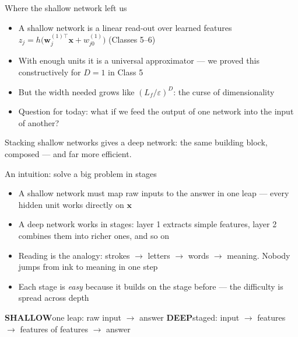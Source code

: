 \documentclass[aspectratio=169, 11pt]{beamer}
\newcommand{\shpar}[2]{%
  \vfill
  {\scriptsize
  \begin{tcolorbox}[enhanced, sidebyside, sidebyside align=top,
                    lefthand ratio=0.485,
                    segmentation style={shc!35, line width=0.6pt},
                    colback=shc!5, colframe=shc!35, boxrule=0.5pt,
                    arc=1.2mm, left=1.6mm, right=1.6mm,
                    top=0.6mm, bottom=0.6mm,
                    before skip=0pt, after skip=0pt]
    {\color{shc}\textbf{SHALLOW}}\hspace{0.55em}#1
  \tcblower
    {\color{dpc}\textbf{DEEP}}\hspace{0.55em}#2
  \end{tcolorbox}}%
  \vspace{0.35em}%
}
\newcommand{\nosrc}{}       %
\begin{document}
\begin{frame}{Where the shallow network left us}
  \nosrc
  \vspace{0.3em}
  \begin{itemize}\setlength{\itemsep}{4pt}
    \item A shallow network is a linear read-out over \alert{learned
          features} $z_j = h\big(\mathbf{w}_j^{(1)\top}\mathbf{x}
          + w^{(1)}_{j0}\big)$ (Classes 5--6)
    \item With enough units it is a \alert{universal approximator}
          --- we proved this constructively for $D=1$ in Class 5
    \item But the width needed grows like
          $(L_{\!f}/\varepsilon)^{D}$: the curse of dimensionality
    \item Question for today: what if we feed the output of one
          network into the \alert{input of another}?
  \end{itemize}
  \vspace{0.4em}
  \begin{redhighlight}
    Stacking shallow networks gives a \alert{deep network}: the same
    building block, composed --- and far more efficient.
  \end{redhighlight}
\end{frame}

\begin{frame}{An intuition: solve a big problem in stages}
  \nosrc
  \vspace{0.2em}
  \begin{itemize}\setlength{\itemsep}{5pt}
    \item A shallow network must map raw inputs to the answer in
          \alert{one leap} --- every hidden unit works directly on
          $\mathbf{x}$
    \item A deep network works in \alert{stages}: layer 1 extracts
          simple features, layer 2 combines them into richer ones,
          and so on
    \item Reading is the analogy: \alert{strokes $\to$ letters $\to$
          words $\to$ meaning}. Nobody jumps from ink to meaning in
          one step
    \item Each stage is \emph{easy} because it builds on the stage
          before --- the difficulty is \alert{spread across depth}
  \end{itemize}
  \shpar{one leap: raw input $\to$ answer}
        {staged: input $\to$ features $\to$ features of features
         $\to$ answer}
\end{frame}
\end{document}
